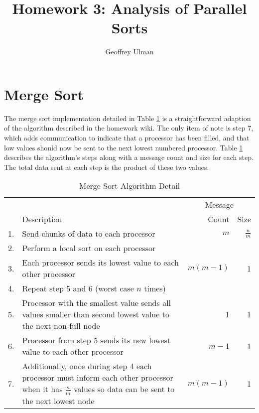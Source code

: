\documentclass[10pt]{article}
\begin{document}
\title{Homework 3: Analysis of Parallel Sorts}
\author{Geoffrey Ulman}
\maketitle

\section{Merge Sort}
The merge sort implementation detailed in Table \ref{merge-sort-table} is a straightforward adaption of the algorithm described in the homework wiki. The only item of note is step 7, which adds communication to indicate that a processor has been filled, and that low values should now be sent to the next lowest numbered processor. Table \ref{merge-sort-table} describes the algorithm's steps along with a message count and size for each step. The total data sent at each step is the product of these two values.


\begin{table}
\caption{Merge Sort Algorithm Detail}
\label{merge-sort-table}
\begin{tabular}{lp{12.5cm}rr}
\toprule
   &             &  \multicolumn{2}{c}{Message} \\
\cmidrule(r){3-4}
   & Description & Count & Size \\
\midrule
1. & Send chunks of data to each processor                          & \(m\)      & \( \frac{n}{m} \) \\
2. & Perform a local sort on each processor                                                          \\
3. & Each processor sends its lowest value to each other processor  & \(m(m-1)\) & 1                 \\
4. & Repeat step 5 and 6 (worst case \(n\) times)                                     \\
5. & Processor with the smallest value sends all values smaller than second lowest value to the next non-full node & 1 & 1\footnotemark \\
6. & Processor from step 5 sends its new lowest value to each other processor  & \(m-1\)    & 1                 \\
7. & Additionally, once during step 4 each processor must inform each other processor when it has \( \frac{n}{m} \) values so data can be sent to the next lowest node & \(m(m-1)\) & 1 \\
\bottomrule
\end{tabular}
\end{table}
\end{document}
